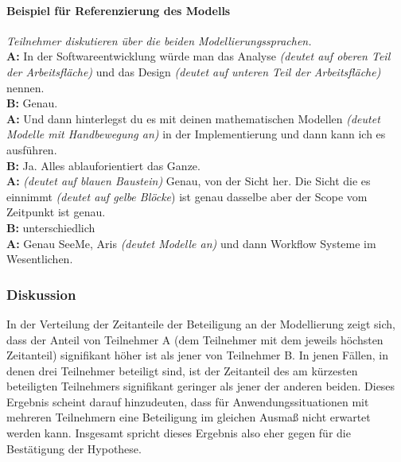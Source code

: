 \paragraph{Beispiel für Referenzierung des Modells} %
\begin{transkript}
	\emph{Teilnehmer diskutieren über die beiden Modellierungssprachen.} \\
	\textbf{A:} In der Softwareentwicklung würde man das Analyse \emph{(deutet auf oberen Teil der Arbeitsfläche)} und das Design \emph{(deutet auf unteren Teil der Arbeitsfläche)} nennen. \\
	\textbf{B:} Genau. \\
	\textbf{A:} Und dann hinterlegst du es mit deinen mathematischen Modellen \emph{(deutet Modelle mit Handbewegung an)} in der Implementierung und dann kann ich es ausführen. \\
	\textbf{B:} Ja. Alles ablauforientiert das Ganze. \\
	\textbf{A:} \emph{(deutet auf blauen Baustein)} Genau, von der Sicht her. Die Sicht die es einnimmt \emph{(deutet auf gelbe Blöcke}) ist genau dasselbe aber der Scope vom Zeitpunkt ist genau. \\
	\textbf{B:} unterschiedlich \\
	\textbf{A:} Genau SeeMe, Aris \emph{(deutet Modelle an)} und dann Workflow Systeme im Wesentlichen. \\
\end{transkript}

\subsubsection{Diskussion} %

In der Verteilung der Zeitanteile der Beteiligung an der Modellierung zeigt sich, dass der Anteil von Teilnehmer A (dem Teilnehmer mit dem jeweils höchsten Zeitanteil) signifikant höher ist als jener von Teilnehmer B. In jenen Fällen, in denen drei Teilnehmer beteiligt sind, ist der Zeitanteil des am kürzesten beteiligten Teilnehmers signifikant geringer als jener der anderen beiden. Dieses Ergebnis scheint darauf hinzudeuten, dass für Anwendungssituationen mit mehreren Teilnehmern eine Beteiligung im gleichen Ausmaß nicht erwartet werden kann. Insgesamt spricht dieses Ergebnis also eher gegen für die Bestätigung der Hypothese. 

